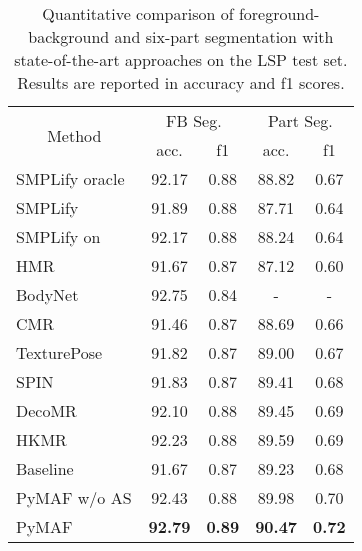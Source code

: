 \documentclass[10pt,twocolumn,letterpaper]{article}
\begin{document}
\begin{table}[t]
\footnotesize
  \centering
    \begin{tabular}{lcccc}
    \toprule
    \multicolumn{1}{c}{\multirow{2}[4]{*}{Method}} & \multicolumn{2}{c}{FB Seg.} & \multicolumn{2}{c}{Part Seg.} \\
\cmidrule{2-5}          & acc.  & f1    & acc.  & f1 \\
    \midrule
    SMPLify oracle~\cite{bogo2016keep} & 92.17 & 0.88  & 88.82 & 0.67 \\
    SMPLify~\cite{bogo2016keep} & 91.89 & 0.88  & 87.71 & 0.64 \\
    SMPLify on~\cite{pavlakos2018learning} & 92.17 & 0.88  & 88.24 & 0.64 \\
    \midrule
    HMR~\cite{kanazawa2018end} & 91.67 & 0.87  & 87.12 & 0.60 \\
    BodyNet~\cite{varol2018bodynet} & 92.75 & 0.84  & -     & - \\
    CMR~\cite{kolotouros2019convolutional} & 91.46 & 0.87  & 88.69 & 0.66 \\
    TexturePose~\cite{pavlakos2019texturepose} & 91.82 & 0.87  & 89.00 & 0.67 \\
    SPIN~\cite{kolotouros2019learning} & 91.83 & 0.87  & 89.41 & 0.68 \\
    DecoMR~\cite{zeng20203d} & 92.10 & 0.88  & 89.45 & 0.69 \\
    HKMR~\cite{georgakis2020hierarchical} & 92.23 & 0.88  & 89.59 & 0.69 \\
    \midrule
    Baseline & 91.67 & 0.87  & 89.23 & 0.68 \\
    PyMAF w/o AS & 92.43 & 0.88  & 89.98 & 0.70 \\
    PyMAF & \textbf{92.79} & \textbf{0.89} & \textbf{90.47} & \textbf{0.72} \\
    \bottomrule
    \end{tabular}\caption{Quantitative comparison of foreground-background and six-part segmentation with state-of-the-art approaches on the LSP test set. Results are reported in accuracy and f1 scores.}
    \vspace{-5mm}
  \label{tab:lsp}\end{table}
\end{document}
